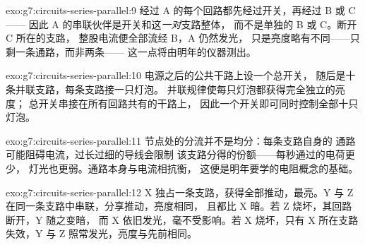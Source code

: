 \begin{solution}{exo:g7:circuits-series-parallel:9}
经过 A 的每个回路都先经过开关，再经过 B 或 C——
因此 A 的串联伙伴是开关和这\emph{一对}支路整体，
而不是单独的 B 或 C。断开 C 所在的支路，
整股电流便全部流经 B，A 仍然发光，
只是亮度略有不同——只剩一条通路，而非两条——
这一点将由明年的仪器测出。
\end{solution}

\begin{solution}{exo:g7:circuits-series-parallel:10}
电源之后的公共干路上设一个总开关，
随后是十条并联支路，每条支路接一只灯泡。
并联规律使每只灯泡都获得完全独立的亮度；
总开关串接在所有回路共有的干路上，
因此一个开关即可同时控制全部十只灯泡。
\end{solution}

\begin{solution}{exo:g7:circuits-series-parallel:11}
节点处的分流并不是均分：每条支路自身的
通路可能阻碍电流，过长过细的导线会限制
该支路分得的份额——每秒通过的电荷更少，
灯光也更弱。通路本身与电流相抗衡，
这便是明年要学的电阻概念的基础。
\end{solution}

\begin{solution}{exo:g7:circuits-series-parallel:12}
X 独占一条支路，获得全部推动，最亮。Y 与 Z
在同一条支路中串联，分享推动，亮度相同，
且都比 X 暗。若 Z 烧坏，其回路断开，Y 随之变暗，
而 X 依旧发光，毫不受影响。若 X 烧坏，只有 X 所在支路
失效，Y 与 Z 照常发光，亮度与先前相同。
\end{solution}


